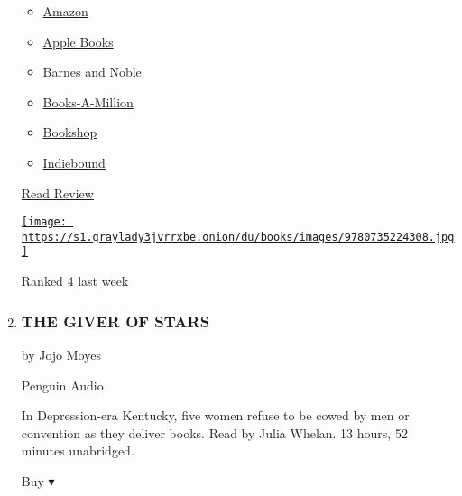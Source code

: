 \begin{enumerate}
  \begin{itemize}
  \tightlist
  \item
    \href{https://www.amazon.com/Little-Fires-Everywhere-Celeste-Ng-ebook/dp/B01N4VW75U?tag=NYTBS-20}{Amazon}
  \item
    \href{https://du-gae-books-dot-nyt-du-prd.appspot.com/buy?title=LITTLE+FIRES+EVERYWHERE\&author=Celeste+Ng}{Apple
    Books}
  \item
    \href{https://www.anrdoezrs.net/click-7990613-11819508?url=https\%3A\%2F\%2Fwww.barnesandnoble.com\%2Fw\%2F\%3Fean\%3D9780525498070}{Barnes
    and Noble}
  \item
    \href{https://www.anrdoezrs.net/click-7990613-35140?url=https\%3A\%2F\%2Fwww.booksamillion.com\%2Fp\%2FLITTLE\%2BFIRES\%2BEVERYWHERE\%2FCeleste\%2BNg\%2F9780525498070}{Books-A-Million}
  \item
    \href{https://bookshop.org/a/3546/9780525498070}{Bookshop}
  \item
    \href{https://www.indiebound.org/book/9780525498070?aff=NYT}{Indiebound}
  \end{itemize}

  \href{https://www.nytimes3xbfgragh.onion/2017/09/25/books/review/little-fires-everywhere-celeste-ng.html}{Read
  Review}

  \href{https://www.nytimes3xbfgragh.onion/2017/09/25/books/review/little-fires-everywhere-celeste-ng.html}{\texttt{[image: https://s1.graylady3jvrrxbe.onion/du/books/images/9780735224308.jpg]}}

  Ranked 4 last week
\item
  \hypertarget{the-giver-of-stars}{%
  \subsubsection{THE GIVER OF STARS}\label{the-giver-of-stars}}

  by Jojo Moyes

  Penguin Audio

  In Depression-era Kentucky, five women refuse to be cowed by men or
  convention as they deliver books. Read by Julia Whelan. 13 hours, 52
  minutes unabridged.

  Buy ▾


\end{enumerate}
